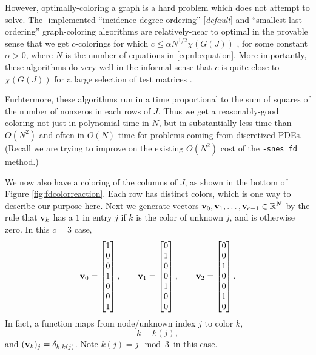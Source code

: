 However, optimally-coloring a graph is a hard problem which \PETSc does not attempt to solve.  The \PETSc-implemented ``incidence-degree ordering'' [\emph{default}] and ``smallest-last ordering'' graph-coloring algorithms are relatively-near to optimal in the provable sense that we get $c$-colorings for which $c \le \alpha N^{1/2} \chi(G(J))$ \citep{ColemanMore1983}, for some constant $\alpha>0$, where $N$ is the number of equations in \eqref{eq:nl:equation}.  More importantly, these algorithms do very well in the informal sense that $c$ is quite close to $\chi(G(J))$ for a large selection of test matrices \citep{ColemanMore1983}.

Furhtermore, these algorithms run in a time proportional to the sum of squares of the number of nonzeros in each rows of $J$.  Thus we get a reasonably-good coloring not just in polynomial time in $N$, but in substantially-less time than $O(N^2)$ and often in $O(N)$ time for problems coming from discretized PDEs.  (Recall we are trying to improve on the existing $O(N^2)$ cost of the \texttt{-snes\_fd} method.)

We now also have a coloring of the columns of $J$, as shown in the bottom of Figure \ref{fig:fdcolorreaction}.  Each row has distinct colors, which is one way to describe our purpose here.  Next we generate vectors $\mathbf{v}_0, \mathbf{v}_1, \dots, \mathbf{v}_{c-1} \in \mathbb{R}^N$ by the rule that $\mathbf{v}_k$ has a $1$ in entry $j$ if $k$ is the color of unknown $j$, and is otherwise zero.  In this $c=3$ case,
\begin{equation}
\mathbf{v}_0 = \begin{bmatrix} 1 \\ 0 \\ 0 \\ 1 \\ 0 \\ 0 \\ 1 \end{bmatrix}, \qquad
\mathbf{v}_1 = \begin{bmatrix} 0 \\ 1 \\ 0 \\ 0 \\ 1 \\ 0 \\ 0 \end{bmatrix}, \qquad
\mathbf{v}_2 = \begin{bmatrix} 0 \\ 0 \\ 1 \\ 0 \\ 0 \\ 1 \\ 0 \end{bmatrix}.
 \label{eq:nl:coloringvecs}
\end{equation}
In fact, a function maps from node/unknown index $j$ to color $k$,
\begin{equation}
k = k(j),  \label{eq:nl:colorfunc}
\end{equation}
and $(\mathbf{v}_k)_j = \delta_{k,k(j)}$.  Note $k(j) = j\mod 3$\, in this case.

